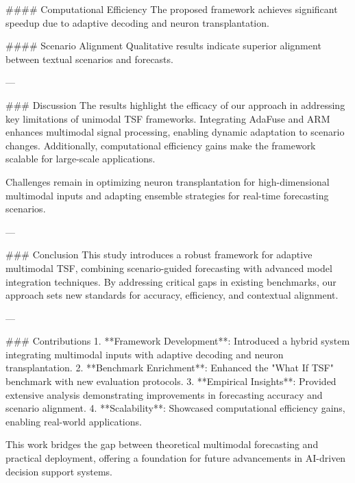 #### Computational Efficiency  
The proposed framework achieves significant speedup due to adaptive decoding and neuron transplantation.

#### Scenario Alignment  
Qualitative results indicate superior alignment between textual scenarios and forecasts.

---

### Discussion  
The results highlight the efficacy of our approach in addressing key limitations of unimodal TSF frameworks. Integrating AdaFuse and ARM enhances multimodal signal processing, enabling dynamic adaptation to scenario changes. Additionally, computational efficiency gains make the framework scalable for large-scale applications.  

Challenges remain in optimizing neuron transplantation for high-dimensional multimodal inputs and adapting ensemble strategies for real-time forecasting scenarios.

---

### Conclusion  
This study introduces a robust framework for adaptive multimodal TSF, combining scenario-guided forecasting with advanced model integration techniques. By addressing critical gaps in existing benchmarks, our approach sets new standards for accuracy, efficiency, and contextual alignment.

---

### Contributions  
1. **Framework Development**: Introduced a hybrid system integrating multimodal inputs with adaptive decoding and neuron transplantation.  
2. **Benchmark Enrichment**: Enhanced the "What If TSF" benchmark with new evaluation protocols.  
3. **Empirical Insights**: Provided extensive analysis demonstrating improvements in forecasting accuracy and scenario alignment.  
4. **Scalability**: Showcased computational efficiency gains, enabling real-world applications.  

This work bridges the gap between theoretical multimodal forecasting and practical deployment, offering a foundation for future advancements in AI-driven decision support systems.